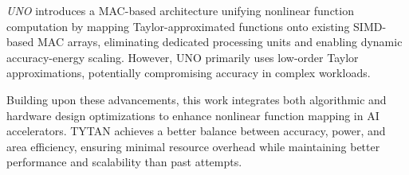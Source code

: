 \documentclass[conference,10pt]{IEEEtran}
\begin{document}
    \textit{UNO} \cite{9502473,wu2021uno} introduces a MAC-based architecture unifying nonlinear function computation by mapping Taylor-approximated functions onto existing SIMD-based MAC arrays, eliminating dedicated processing units and enabling dynamic accuracy-energy scaling. However, UNO primarily uses low-order Taylor approximations, potentially compromising accuracy in complex workloads.

    Building upon these advancements, this work integrates both algorithmic and hardware design optimizations to enhance nonlinear function mapping in AI accelerators. TYTAN achieves a better balance between accuracy, power, and area efficiency, ensuring minimal resource overhead while maintaining better performance and scalability than past attempts.


    
\end{document}
